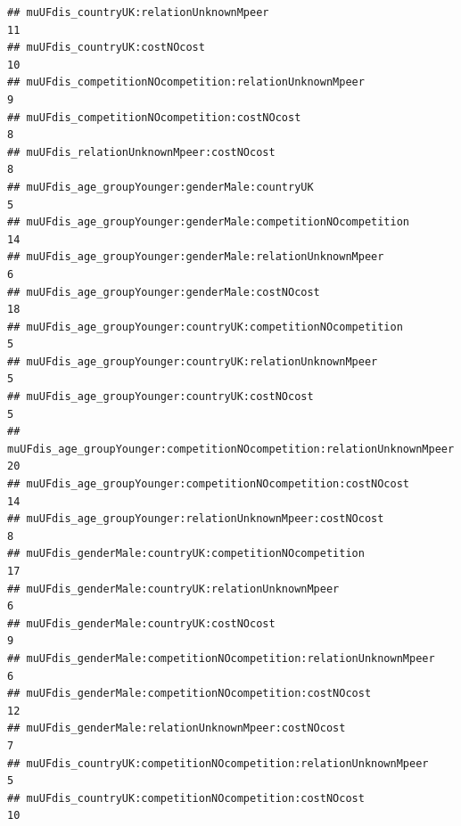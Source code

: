 \documentclass[
]{article}
\begin{document}
\begin{verbatim}
## muUFdis_countryUK:relationUnknownMpeer                                                                       11
## muUFdis_countryUK:costNOcost                                                                                 10
## muUFdis_competitionNOcompetition:relationUnknownMpeer                                                         9
## muUFdis_competitionNOcompetition:costNOcost                                                                   8
## muUFdis_relationUnknownMpeer:costNOcost                                                                       8
## muUFdis_age_groupYounger:genderMale:countryUK                                                                 5
## muUFdis_age_groupYounger:genderMale:competitionNOcompetition                                                 14
## muUFdis_age_groupYounger:genderMale:relationUnknownMpeer                                                      6
## muUFdis_age_groupYounger:genderMale:costNOcost                                                               18
## muUFdis_age_groupYounger:countryUK:competitionNOcompetition                                                   5
## muUFdis_age_groupYounger:countryUK:relationUnknownMpeer                                                       5
## muUFdis_age_groupYounger:countryUK:costNOcost                                                                 5
## muUFdis_age_groupYounger:competitionNOcompetition:relationUnknownMpeer                                       20
## muUFdis_age_groupYounger:competitionNOcompetition:costNOcost                                                 14
## muUFdis_age_groupYounger:relationUnknownMpeer:costNOcost                                                      8
## muUFdis_genderMale:countryUK:competitionNOcompetition                                                        17
## muUFdis_genderMale:countryUK:relationUnknownMpeer                                                             6
## muUFdis_genderMale:countryUK:costNOcost                                                                       9
## muUFdis_genderMale:competitionNOcompetition:relationUnknownMpeer                                              6
## muUFdis_genderMale:competitionNOcompetition:costNOcost                                                       12
## muUFdis_genderMale:relationUnknownMpeer:costNOcost                                                            7
## muUFdis_countryUK:competitionNOcompetition:relationUnknownMpeer                                               5
## muUFdis_countryUK:competitionNOcompetition:costNOcost                                                        10

\end{verbatim}
\end{document}
